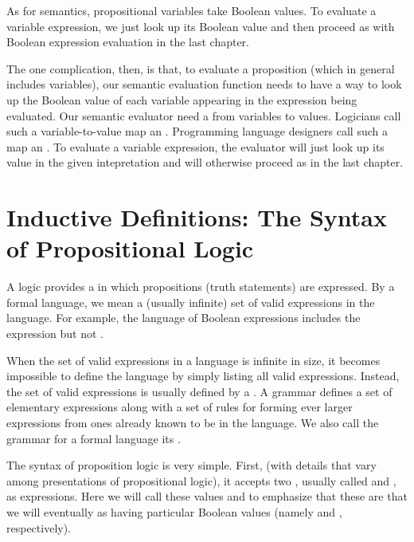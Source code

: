 \documentclass[letterpaper,10pt,english]{sphinxmanual}
\begin{document}
As for semantics, propositional variables take Boolean values. To
evaluate a variable expression, we just look up its Boolean value
and then proceed as with Boolean expression evaluation in the last
chapter.

The one complication, then, is that, to evaluate a proposition (which
in general includes variables), our semantic evaluation function needs
to have a way to look up the Boolean value of each variable appearing
in the expression being evaluated. Our semantic evaluator need a 
from variables to values.  Logicians call such a variable-to-value map
an . Programming language designers call such a map an
. To evaluate a variable expression, the evaluator will
just look up its value in the given intepretation and will otherwise
proceed as in the last chapter.


\section{Inductive Definitions: The Syntax of Propositional Logic}
\label{\detokenize{09-propositional-logic:inductive-definitions-the-syntax-of-propositional-logic}}
A logic provides a  in which propositions (truth
statements) are expressed. By a formal language, we mean a (usually
infinite) set of valid expressions in the language. For example, the
language of Boolean expressions includes the expression  but not .

When the set of valid expressions in a language is infinite in size,
it becomes impossible to define the language by simply listing all
valid expressions. Instead, the set of valid expressions is usually
defined  by a . A grammar defines a set of
elementary expressions along with a set of rules for forming ever
larger expressions from ones already known to be in the language. We
also call the grammar for a formal language its .

The syntax of proposition logic is very simple. First, (with details
that vary among presentations of propositional logic), it accepts two
, usually called  and , as expressions.
Here we will call these values  and  to emphasize that
these are  that we will eventually  as having
particular Boolean values (namely  and , respectively).
\end{document}
